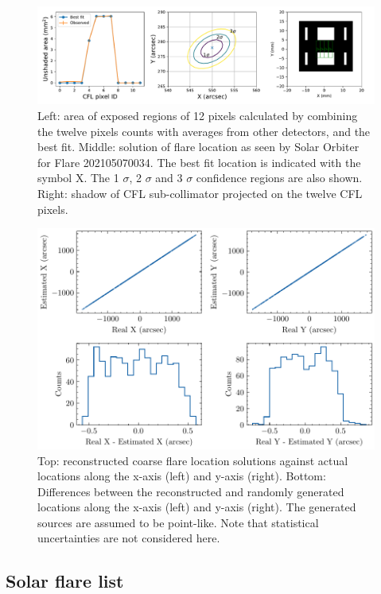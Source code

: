 \documentclass{aa}
\begin{document}
\begin{figure}
  \centering
  \includegraphics[width=0.95\linewidth]{figures/cflMay07.pdf}
  \caption{Left: area of exposed regions of 12 pixels calculated by combining
  the twelve pixels counts with averages from other detectors, and the best fit.
   Middle: solution of flare location as seen by Solar Orbiter for Flare 202105070034.
   The best fit location is indicated with the symbol X. The 1 $\sigma$, 2 $\sigma$ and 3 $\sigma$ confidence
   regions are also shown. Right: shadow of CFL sub-collimator projected on the twelve CFL pixels.}
  \label{fig:cflpattern}
\end{figure}




\begin{figure}
  \centering
  \includegraphics[width=0.7\linewidth]{figures/cflError.pdf}
  \caption{Top: reconstructed coarse flare location solutions against actual locations along the x-axis (left) and y-axis (right). Bottom:
  Differences between the reconstructed and randomly generated locations along
   the x-axis (left) and y-axis (right). The generated sources are assumed to be point-like. Note that statistical
   uncertainties are not considered here. 
    }
  \label{fig:cflerror}
\end{figure}




\subsection{Solar flare list}
\end{document}

